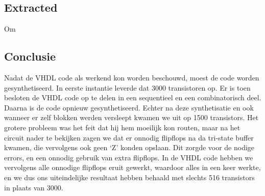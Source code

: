 \documentclass{scrartcl} %
\begin{document}
\subsection{Extracted}
Om 


\subsection{Conclusie}
Nadat de VHDL code als werkend kon worden beschouwd, moest de code worden gesynthetiseerd. In eerste instantie leverde dat 3000 transistoren op. Er is toen besloten de VHDL code op te delen in een sequentieel en een combinatorisch deel. Daarna is de code opnieuw gesynthetiseerd.  Echter na deze synthetisatie en ook wanneer er zelf blokken werden versleept kwamen we uit op 1500 transistors. Het grotere probleem was het feit dat hij hem moeilijk kon routen, maar na het circuit nader te bekijken zagen we dat er onnodig flipflops na da tri-state buffer kwamen, die vervolgens ook geen ‘Z’ konden opslaan. Dit zorgde voor de nodige errors, en een onnodig gebruik van extra flipflops. In de VHDL code hebben we vervolgens alle onnodige flipflops eruit gewerkt, waardoor alles in een keer werkte, en we dus ons uiteindelijke resultaat hebben behaald met slechts 516 transistors in plaats van 3000. 
\end{document}

